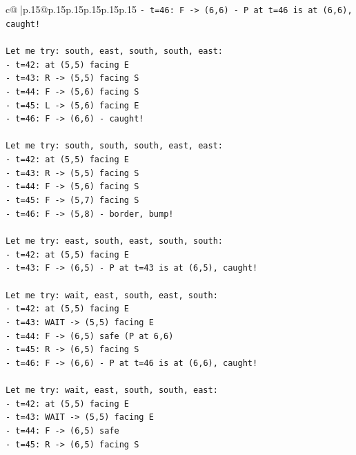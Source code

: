 \documentclass{article}
\begin{document}
{\begin{supertabular}{c@{$\;$}|p{.15\linewidth}@{}p{.15\linewidth}p{.15\linewidth}p{.15\linewidth}p{.15\linewidth}p{.15\linewidth}}
{{{\texttt{{-} t=46: F {-}> (6,6) {-} P at t=46 is at (6,6), caught!} \\
\\ 
\texttt{Let me try: south, east, south, south, east:} \\
\texttt{{-} t=42: at (5,5) facing E} \\
\texttt{{-} t=43: R {-}> (5,5) facing S} \\
\texttt{{-} t=44: F {-}> (5,6) facing S} \\
\texttt{{-} t=45: L {-}> (5,6) facing E} \\
\texttt{{-} t=46: F {-}> (6,6) {-} caught!} \\
\\ 
\texttt{Let me try: south, south, south, east, east:} \\
\texttt{{-} t=42: at (5,5) facing E} \\
\texttt{{-} t=43: R {-}> (5,5) facing S} \\
\texttt{{-} t=44: F {-}> (5,6) facing S} \\
\texttt{{-} t=45: F {-}> (5,7) facing S} \\
\texttt{{-} t=46: F {-}> (5,8) {-} border, bump!} \\
\\ 
\texttt{Let me try: east, south, east, south, south:} \\
\texttt{{-} t=42: at (5,5) facing E} \\
\texttt{{-} t=43: F {-}> (6,5) {-} P at t=43 is at (6,5), caught!} \\
\\ 
\texttt{Let me try: wait, east, south, east, south:} \\
\texttt{{-} t=42: at (5,5) facing E} \\
\texttt{{-} t=43: WAIT {-}> (5,5) facing E} \\
\texttt{{-} t=44: F {-}> (6,5) safe (P at 6,6)} \\
\texttt{{-} t=45: R {-}> (6,5) facing S} \\
\texttt{{-} t=46: F {-}> (6,6) {-} P at t=46 is at (6,6), caught!} \\
\\ 
\texttt{Let me try: wait, east, south, south, east:} \\
\texttt{{-} t=42: at (5,5) facing E} \\
\texttt{{-} t=43: WAIT {-}> (5,5) facing E} \\
\texttt{{-} t=44: F {-}> (6,5) safe} \\
\texttt{{-} t=45: R {-}> (6,5) facing S} \\
}}}
\end{supertabular}}
\end{document}
